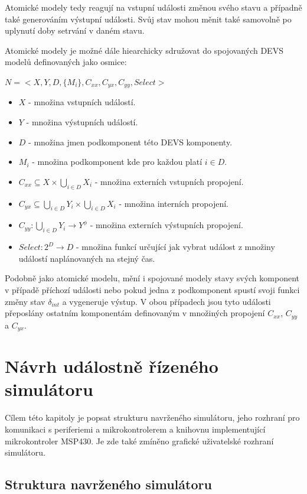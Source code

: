 Atomické modely tedy reagují na vstupní události změnou svého stavu a případně také generováním výstupní události. Svůj stav mohou měnit také samovolně po uplynutí doby setrvání v daném stavu.

Atomické modely je možné dále hiearchicky sdružovat do spojovaných DEVS modelů definovaných jako osmice:

\begin{math}
N=<X,Y,D,\{M_i\},C_{xx}, C_{yx}, C_{yy}, Select>
\end{math}

\begin{itemize}
\item $X$ - množina vstupních událostí.
\item $Y$ - množina výstupních událostí.
\item $D$ - množina jmen podkomponent této DEVS komponenty.
\item $M_i$ - množina podkomponent kde pro každou platí $i \in D$.
\item $C_{xx}\subseteq X \times \bigcup_{i \in D} X_i$ - množina externích vstupních propojení.
\item $C_{yx}\subseteq \bigcup_{i \in D} Y_i \times \bigcup_{i \in D} X_i$ - množina interních propojení.
\item $C_{yy}: \bigcup_{i \in D} Y_i \rightarrow Y^\phi$ - množina externích výstupních propojení.
\item $Select:2^D \rightarrow D$ - množina funkcí určující jak vybrat událost z množiny událostí naplánovaných na stejný čas.
\end{itemize}

Podobně jako atomické modelu, mění i spojované modely stavy svých komponent v případě příchozí události nebo pokud jedna z podkomponent spustí svoji funkci změny stav $\delta_{int}$ a vygeneruje výstup. V obou případech jsou tyto události přeposlány ostatním komponentám definovaným v množiných propojení $C_{xx}$, $C_{yy}$ a $C_{yx}$.

\chapter{Návrh událostně řízeného simulátoru}
\label{navrh}

Cílem této kapitoly je popsat strukturu navrženého simulátoru, jeho rozhraní pro komunikaci s periferiemi a mikrokontrolerem a knihovnu implementující mikrokontroler MSP430. Je zde také zmíněno grafické uživatelské rozhraní simulátoru.

\section{Struktura navrženého simulátoru}

